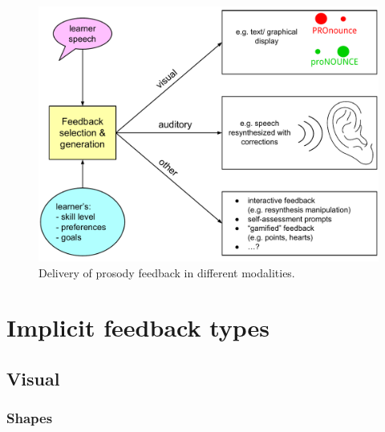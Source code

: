 





	\begin{figure}[htb]
		\includegraphics[width=\textwidth]{img/feedback}
		\caption{Delivery of prosody feedback in different modalities. }
		\label{fig:feedback}
	\end{figure}

%




	\section{Implicit feedback types}
		\subsection{Visual }
			\subsubsection{Shapes}

